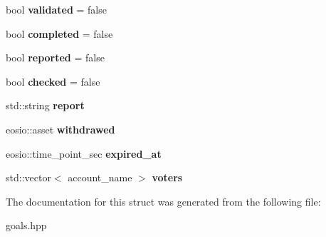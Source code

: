 \begin{DoxyCompactItemize}
bool {\bfseries validated} = false
\item 
\mbox{\label{structeosio_1_1goals_ac07d7852b17034793a6999c004cd3d18}} 
bool {\bfseries completed} = false
\item 
\mbox{\label{structeosio_1_1goals_a79c0972bd8c348a5474657dd6bbeb438}} 
bool {\bfseries reported} = false
\item 
\mbox{\label{structeosio_1_1goals_afed9ef8bf9076790cdba12d09f56db09}} 
bool {\bfseries checked} = false
\item 
\mbox{\label{structeosio_1_1goals_a68bb043851ffdbb894a822775db0d210}} 
std\+::string {\bfseries report}
\item 
\mbox{\label{structeosio_1_1goals_a6947f1f0e1874749a4f7cfebc6101567}} 
eosio\+::asset {\bfseries withdrawed}
\item 
\mbox{\label{structeosio_1_1goals_a85dfb357989d06a25e98fcc817f153c1}} 
eosio\+::time\+\_\+point\+\_\+sec {\bfseries expired\+\_\+at}
\item 
\mbox{\label{structeosio_1_1goals_a7b9d16d745e39692c43a85de9988cd0f}} 
std\+::vector$<$ account\+\_\+name $>$ {\bfseries voters}
\end{DoxyCompactItemize}


The documentation for this struct was generated from the following file\+:\begin{DoxyCompactItemize}
\item 
goals.\+hpp\end{DoxyCompactItemize}
